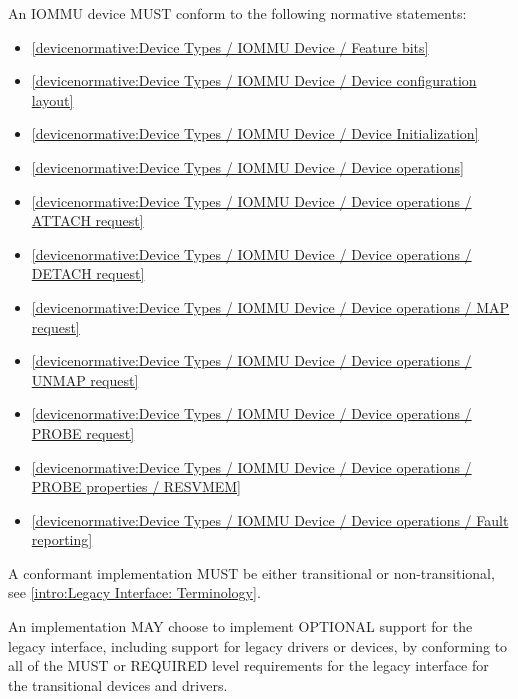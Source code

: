 An IOMMU device MUST conform to the following normative statements:

\begin{itemize}
\item \ref{devicenormative:Device Types / IOMMU Device / Feature bits}
\item \ref{devicenormative:Device Types / IOMMU Device / Device configuration layout}
\item \ref{devicenormative:Device Types / IOMMU Device / Device Initialization}
\item \ref{devicenormative:Device Types / IOMMU Device / Device operations}
\item \ref{devicenormative:Device Types / IOMMU Device / Device operations / ATTACH request}
\item \ref{devicenormative:Device Types / IOMMU Device / Device operations / DETACH request}
\item \ref{devicenormative:Device Types / IOMMU Device / Device operations / MAP request}
\item \ref{devicenormative:Device Types / IOMMU Device / Device operations / UNMAP request}
\item \ref{devicenormative:Device Types / IOMMU Device / Device operations / PROBE request}
\item \ref{devicenormative:Device Types / IOMMU Device / Device operations / PROBE properties / RESVMEM}
\item \ref{devicenormative:Device Types / IOMMU Device / Device operations / Fault reporting}
\end{itemize}

\label{sec:Conformance / Legacy Interface: Transitional Device and Transitional Driver Conformance}
A conformant implementation MUST be either transitional or
non-transitional, see \ref{intro:Legacy
Interface: Terminology}.

An implementation MAY choose to implement OPTIONAL support for the
legacy interface, including support for legacy drivers
or devices, by conforming to all of the MUST or
REQUIRED level requirements for the legacy interface
for the transitional devices and drivers.

